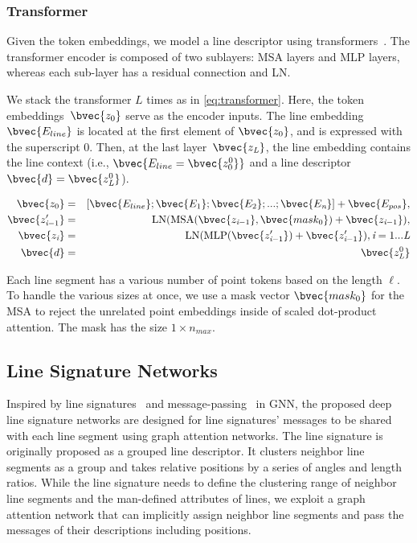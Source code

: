 \documentclass[letterpaper, 10 pt, journal, twoside]{ieeetran}
\begin{document}
\subsubsection{Transformer}

Given the token embeddings, we model a line descriptor using transformers~\cite{Vaswani2017}. The transformer encoder is composed of two sublayers: \ac{MSA} layers and \ac{MLP} layers, whereas each sub-layer has a residual connection and \ac{LN}.

We stack the transformer $L$ times as in \eqref{eq:transformer}. Here, the token embeddings~$\bvec{z_0}$ serve as the encoder inputs. The line embedding~$\bvec{E_{line}}$ is located at the first element of $\bvec{z_0}$, and is expressed with the superscript $0$. Then, at the last layer~$\bvec{z_{\textit{L}}}$, the line embedding contains the line context (i.e., $\bvec{E_{line}=\bvec{z_0^0}}$ and a line descriptor $\bvec{d} = \bvec{z_{\textit{L}}^0}$).

\begin{eqnarray}
  \label{eq:transformer}
  \bvec{z_0} &=& [\bvec{E_{line}}; \bvec{E_1}; \bvec{E_2}; ... ;\bvec{E_{\textit{n}}}] + \bvec{E_{pos}},  \\
  \bvec{z'_{\textit{i}-1}} &=& \text{LN}(\text{MSA}(\bvec{z_{\textit{i}-1}}, \bvec{mask_0}) + \bvec{z_{\textit{i}-1}}), \nonumber \\
  \bvec{z_{\textit{i}}} &=& \text{LN}(\text{MLP}(\bvec{z'_{\textit{i}-1}}) + \bvec{z'_{\textit{i}-1}}), \textit{i} = 1...\textit{L} \nonumber \\
  \bvec{d} &=& \bvec{z_{\textit{L}}^0} \nonumber
\end{eqnarray}

Each line segment has a various number of point tokens based on the length $\ell$. To handle the various sizes at once, we use a mask vector $\bvec{mask_0}$ for the \ac{MSA} to reject the unrelated point embeddings inside of scaled dot-product attention. The mask has the size $1 \times n_{max}$.

\subsection{Line Signature Networks}

Inspired by line signatures~\cite{Wang2009} and message-passing~\cite{Sarlin2019, Velickovic2018} in \ac{GNN}, the proposed deep line signature networks are designed for line signatures' messages to be shared with each line segment using graph attention networks. The line signature is originally proposed as a grouped line descriptor. It clusters neighbor line segments as a group and takes relative positions by a series of angles and length ratios. While the line signature needs to define the clustering range of neighbor line segments and the man-defined attributes of lines, we exploit a graph attention network that can implicitly assign neighbor line segments and pass the messages of their descriptions including positions.
\end{document}
